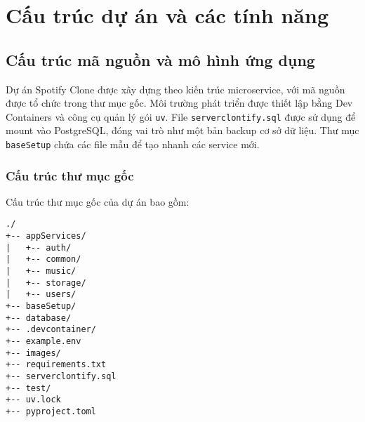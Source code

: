 \chapter{Cấu trúc dự án và các tính năng}
\label{ch:project_structure}

\section{Cấu trúc mã nguồn và mô hình ứng dụng}
\label{sec:source_code_structure}

Dự án Spotify Clone được xây dựng theo kiến trúc microservice, với mã nguồn được tổ chức trong thư mục gốc. Môi trường phát triển được thiết lập bằng Dev Containers và công cụ quản lý gói \texttt{uv}. File \texttt{serverclontify.sql} được sử dụng để mount vào PostgreSQL, đóng vai trò như một bản backup cơ sở dữ liệu. Thư mục \texttt{baseSetup} chứa các file mẫu để tạo nhanh các service mới.

\subsection{Cấu trúc thư mục gốc}
\label{subsec:root_directory_structure}

Cấu trúc thư mục gốc của dự án bao gồm:

\begin{verbatim}
./
+-- appServices/
|   +-- auth/
|   +-- common/
|   +-- music/
|   +-- storage/
|   +-- users/
+-- baseSetup/
+-- database/
+-- .devcontainer/
+-- example.env
+-- images/
+-- requirements.txt
+-- serverclontify.sql
+-- test/
+-- uv.lock
+-- pyproject.toml
\end{verbatim}

